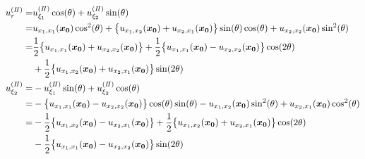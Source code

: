\documentclass[titlepage,a4paper,12pt,oneside,dvipdfmx]{jsbook}
\begin{document}
\begin{align}
	u_{r}^{(I\hspace{-.15em}I)}=
		&u_{\xi_1}^{(I\hspace{-.15em}I)}\cos(\theta)+u_{\xi_2}^{(I\hspace{-.15em}I)}\sin(\theta)
		\nonumber
		\\
		=&u_{x_{1},x_{1}}(\bm{x_{0}})\cos^2(\theta)+\bigl\{u_{x_{1},x_{2}}(\bm{x_{0}})
		+u_{x_{2},x_{1}}(\bm{x_{0}})\bigr\}\sin(\theta)\cos(\theta)
		+u_{x_{2},x_{2}}(\bm{x_{0}})\sin^2(\theta)
		\nonumber
		\\
		=&\frac{1}{2}\bigl\{u_{x_{1},x_{1}}(\bm{x_{0}})+u_{x_{2},x_{2}}(\bm{x_{0}})\bigr\}
		+\frac{1}{2}\bigl\{u_{x_{1},x_{1}}(\bm{x_{0}})-u_{x_{2},x_{2}}(\bm{x_{0}})\bigr\}\cos(2\theta)
		\nonumber
		\\
		&+\frac{1}{2}\bigl\{u_{x_{1},x_{2}}(\bm{x_{0}})+u_{x_{2},x_{1}}(\bm{x_{0}})\bigr\}\sin(2\theta)
		\\
	u_{\xi_2}^{(I\hspace{-.15em}I)}=
		&-u_{\xi_1}^{(I\hspace{-.15em}I)}\sin(\theta)+u_{\xi_2}^{(I\hspace{-.15em}I)}\cos(\theta)
		\nonumber
		\\
		=&-\bigl\{u_{x_{1},x_{1}}(\bm{x_{0}})-u_{x_{2},x_{2}}(\bm{x_{0}})\bigr\}\cos(\theta)\sin(\theta)
		-u_{x_{1},x_{2}}(\bm{x_{0}})\sin^2(\theta)+u_{x_{2},x_{1}}(\bm{x_{0}})\cos^2(\theta)
		\nonumber
		\\
		=&-\frac{1}{2}\bigl\{u_{x_{1},x_{2}}(\bm{x_{0}})-u_{x_{2},x_{1}}(\bm{x_{0}})\bigr\}
		+\frac{1}{2}\bigl\{u_{x_{1},x_{2}}(\bm{x_{0}})+u_{x_{2},x_{1}}(\bm{x_{0}})\bigr\}\cos(2\theta)
		\nonumber
		\\
		&-\frac{1}{2}\bigl\{u_{x_{1},x_{1}}(\bm{x_{0}})-u_{x_{2},x_{2}}(\bm{x_{0}})\bigr\}\sin(2\theta)
\end{align}
\end{document}
